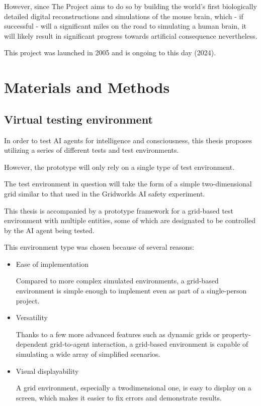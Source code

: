 \documentclass[masterthesis]{fer}
\begin{document}
However, since The Project aims to do so by building the world’s first biologically detailed digital reconstructions and simulations of the mouse brain, which - if successful - will a significant miles on the road to simulating a human brain, it will likely result in significant progress towards artificial consequence nevertheless.

This project was launched in 2005 and is ongoing to this day (2024).
\chapter{Materials and Methods}
\label{sec:materialsandmethods}
\section{Virtual testing environment}
In order to test AI agents for intelligence and consciousness, this thesis proposes utilizing a series of different tests and test environments.

However, the prototype will only rely on a single type of test environment.

The test environment in question will take the form of a simple two-dimensional grid similar to that used in the Gridworlds AI safety experiment.

This thesis is accompanied by a prototype framework for a grid-based test environment with multiple entities, some of which are designated to be controlled by the AI agent being tested.

This environment type was chosen because of several reasons:
\begin{itemize}
\item{Ease of implementation}

Compared to more complex simulated environments,
a grid-based environment is simple enough to implement even as part
of a single-person project.

\item{Versatility}

Thanks to a few more advanced features such as dynamic grids or
property-dependent grid-to-agent interaction, a grid-based environment is capable of simulating a wide array of simplified scenarios.

\item{Visual displayability}

A grid environment, especially a twodimensional one, is easy to display on a screen, which makes it easier to fix errors and demonstrate results.
\end{itemize}
\end{document}

